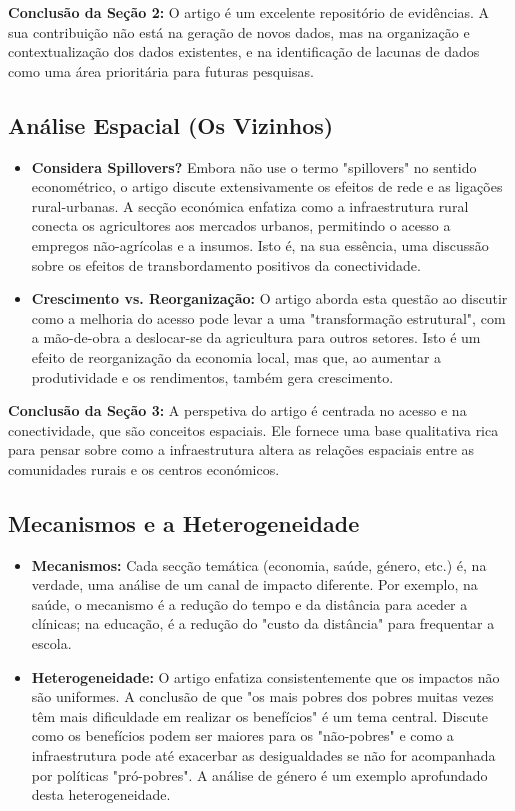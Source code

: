 \documentclass[12pt, a4paper]{article}
\begin{document}
\noindent\textbf{Conclusão da Seção 2:} O artigo é um excelente repositório de evidências. A sua contribuição não está na geração de novos dados, mas na organização e contextualização dos dados existentes, e na identificação de lacunas de dados como uma área prioritária para futuras pesquisas.

\subsection{Análise Espacial (Os Vizinhos)}

\begin{itemize}
    \item \textbf{Considera Spillovers?} Embora não use o termo "spillovers" no sentido econométrico, o artigo discute extensivamente os efeitos de rede e as ligações rural-urbanas. A secção económica enfatiza como a infraestrutura rural conecta os agricultores aos mercados urbanos, permitindo o acesso a empregos não-agrícolas e a insumos. Isto é, na sua essência, uma discussão sobre os efeitos de transbordamento positivos da conectividade.
    \item \textbf{Crescimento vs. Reorganização:} O artigo aborda esta questão ao discutir como a melhoria do acesso pode levar a uma "transformação estrutural", com a mão-de-obra a deslocar-se da agricultura para outros setores. Isto é um efeito de reorganização da economia local, mas que, ao aumentar a produtividade e os rendimentos, também gera crescimento.
\end{itemize}

\noindent\textbf{Conclusão da Seção 3:} A perspetiva do artigo é centrada no acesso e na conectividade, que são conceitos espaciais. Ele fornece uma base qualitativa rica para pensar sobre como a infraestrutura altera as relações espaciais entre as comunidades rurais e os centros económicos.

\subsection{Mecanismos e a Heterogeneidade}

\begin{itemize}
    \item \textbf{Mecanismos:} Cada secção temática (economia, saúde, género, etc.) é, na verdade, uma análise de um canal de impacto diferente. Por exemplo, na saúde, o mecanismo é a redução do tempo e da distância para aceder a clínicas; na educação, é a redução do "custo da distância" para frequentar a escola.
    \item \textbf{Heterogeneidade:} O artigo enfatiza consistentemente que os impactos não são uniformes. A conclusão de que "os mais pobres dos pobres muitas vezes têm mais dificuldade em realizar os benefícios" é um tema central. Discute como os benefícios podem ser maiores para os "não-pobres" e como a infraestrutura pode até exacerbar as desigualdades se não for acompanhada por políticas "pró-pobres". A análise de género é um exemplo aprofundado desta heterogeneidade.
\end{itemize}
\end{document}

